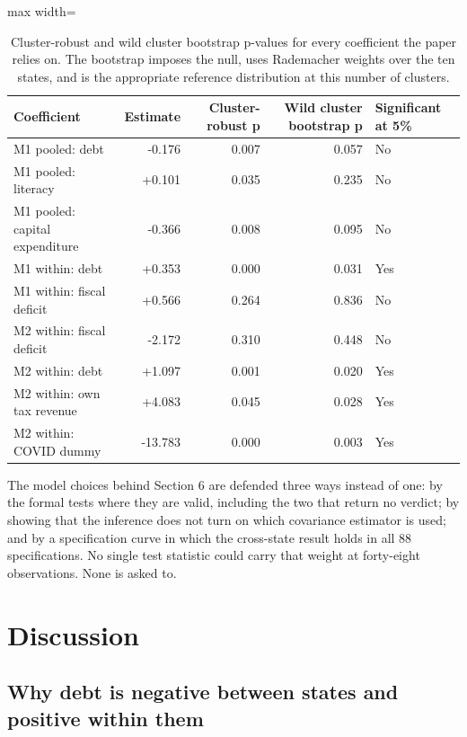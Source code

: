 \documentclass[12pt,a4paper]{article}
\begin{document}
\begin{table}[H]
\centering
\caption{Cluster-robust and wild cluster bootstrap p-values for every coefficient the paper relies on. The bootstrap imposes the null, uses Rademacher weights over the ten states, and is the appropriate reference distribution at this number of clusters.}
\label{tab:34}
\footnotesize
\begin{adjustbox}{max width=\textwidth}
\begin{tabular}{@{}lrrrl@{}}
\toprule
Coefficient & Estimate & Cluster-robust p & Wild cluster bootstrap p & Significant at 5\% \\
\midrule
M1 pooled: debt & -0.176 & 0.007 & 0.057 & No \\
M1 pooled: literacy & +0.101 & 0.035 & 0.235 & No \\
M1 pooled: capital expenditure & -0.366 & 0.008 & 0.095 & No \\
M1 within: debt & +0.353 & 0.000 & 0.031 & Yes \\
M1 within: fiscal deficit & +0.566 & 0.264 & 0.836 & No \\
M2 within: fiscal deficit & -2.172 & 0.310 & 0.448 & No \\
M2 within: debt & +1.097 & 0.001 & 0.020 & Yes \\
M2 within: own tax revenue & +4.083 & 0.045 & 0.028 & Yes \\
M2 within: COVID dummy & -13.783 & 0.000 & 0.003 & Yes \\
\bottomrule
\end{tabular}
\end{adjustbox}
\end{table}

The model choices behind Section 6 are defended three ways instead of one: by the formal tests where they are valid, including the two that return no verdict; by showing that the inference does not turn on which covariance estimator is used; and by a specification curve in which the cross-state result holds in all 88 specifications. No single test statistic could carry that weight at forty-eight observations. None is asked to.

\FloatBarrier
\section{Discussion}

\subsection{Why debt is negative between states and positive within them}
\end{document}
